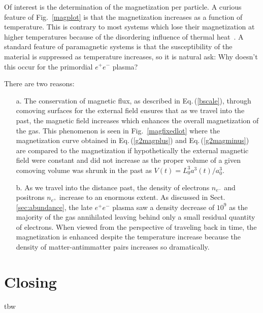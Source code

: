 \documentclass[a4paper]{article}
\newcommand{\req}[1]{Eq.\,(\ref{#1})}
\newcommand{\rf}[1]{Fig.~{\ref{#1}}}
\newcommand{\rsec}[1]{Sect.\,{\ref{#1}}}
\begin{document}
Of interest is the determination of the magnetization per particle. A curious feature of \rf{magplot} is that the magnetization increases as a function of temperature. This is contrary to most systems which lose their magnetization at higher temperatures because of the disordering influence of thermal heat~\cite{huang1991statistical}. A standard feature of paramagnetic systems is that the susceptibility of the material is suppressed as temperature increases, so it is natural ask: Why doesn't this occur for the primordial $e^{+}e^{-}$ plasma?

There are two reasons:
\begin{itemize}
    \item[a.] The conservation of magnetic flux, as described in \req{bscale}, through comoving surfaces for the external field ensures that as we travel into the past, the magnetic field increases which enhances the overall magnetization of the gas. This phenomenon is seen in \rf{magfixedlot} where the magnetization curve obtained in \req{g2magplus} and \req{g2magminus} are compared to the magnetization if hypothetically the external magnetic field were constant and did not increase as the proper volume of a given comoving volume was shrunk in the past as $V(t)=L_{0}^{3}a^{3}(t)/a_{0}^{3}$.
    \item[b.] As we travel into the distance past, the density of electrons $n_{e^{-}}$ and positrons $n_{e^{+}}$ increase to an enormous extent. As discussed in \rsec{sec:abundance}, the late $e^{+}e^{-}$ plasma saw a density decrease of $10^{9}$ as the majority of the gas annihilated leaving behind only a small residual quantity of electrons. When viewed from the perspective of traveling back in time, the magnetization is enhanced despite the temperature increase because the density of matter-antimmatter pairs increases so dramatically.
\end{itemize}

\section{Closing}
\label{sec:conclusions}
\noindent tbw



\end{document}
